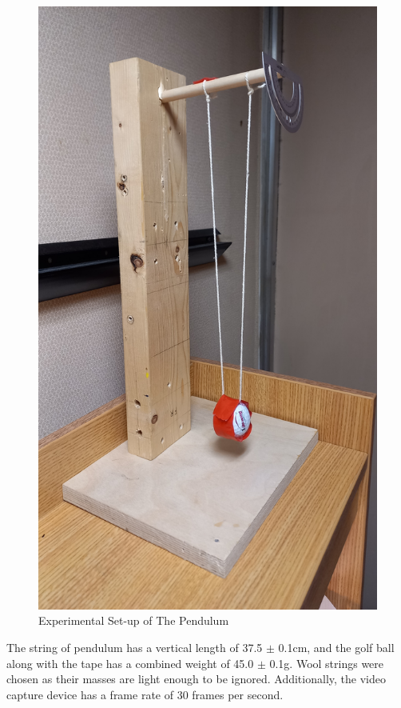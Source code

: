 \documentclass{article}
\begin{document}
\begin{figure}[!htb]
	\centering
	\includegraphics[scale=0.025, angle = 270]{experimental_setup_pendulum.jpg}
	\caption{Experimental Set-up of The Pendulum}
	\label{fig_angle}
\end{figure}

 The string of pendulum has a vertical length of 37.5 $\pm$ 0.1cm, and the golf ball along with the tape has a combined weight of 45.0 $\pm$ 0.1g. Wool strings were chosen as their masses are light enough to be ignored. Additionally, the video capture device has a frame rate of 30 frames per second.
\end{document}
